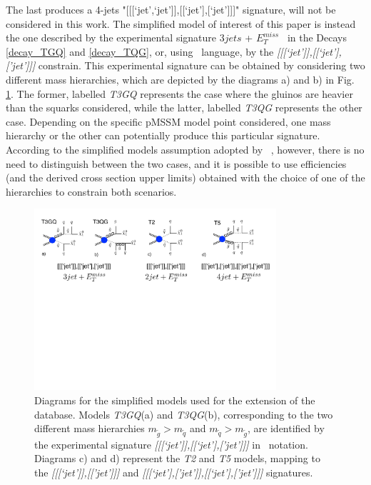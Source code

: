 \documentclass[epj,nopacs,fleqn]{svjour}
\newcommand{\MET}{{ $E_T ^{miss}$}}
\begin{document}
The last produces a 4-jets "[[[`jet',`jet']],[[`jet'],[`jet']]]" signature, will not be considered in this work. The simplified model of interest of this paper is instead the one described by the experimental signature $3jets$ + \MET~ in the Decays \ref{decay_TGQ} and \ref{decay_TQG}, or, using \SMO~language, by the \textit{[[[`jet']],[[`jet'],['jet']]]} constrain. This experimental signature can be obtained by considering two different mass hierarchies, which are depicted by the diagrams a) and b) in Fig. \ref{Diagrams}. The former, labelled \textit{T3GQ} represents the case where the gluinos are heavier than the squarks considered, while the latter, labelled \textit{T3QG} represents the other case. Depending on the specific pMSSM model point considered, one mass hierarchy or the other can potentially produce this particular signature. According to the simplified models assumption adopted by \SMO~, however, there is no need to distinguish between the two cases, and it is possible to use efficiencies (and the derived cross section upper limits) obtained with the choice of one of the hierarchies to constrain both scenarios. 
\begin{figure}
\begin{center}
\includegraphics[width=0.8\textwidth]{PLOTS/Diagrams_2}
\end{center}
\caption{Diagrams for the simplified models used for the extension of the database. Models \textit{T3GQ}(a) and \textit{T3QG}(b), corresponding to the two different mass hierarchies $m_{\tilde g} > m_{\tilde q}$ and $m_{\tilde q} > m_{\tilde g}$, are identified by the experimental signature \textit{[[[`jet']],[[`jet'],['jet']]]} in \SMO~notation. Diagrams c) and d) represent the \textit{T2} and \textit{T5} models, mapping to the \textit{[[[`jet']],[['jet']]]} and \textit{[[[`jet'],['jet']],[[`jet'],['jet']]]} signatures.}
\label{Diagrams}
\end{figure}
\end{document}
